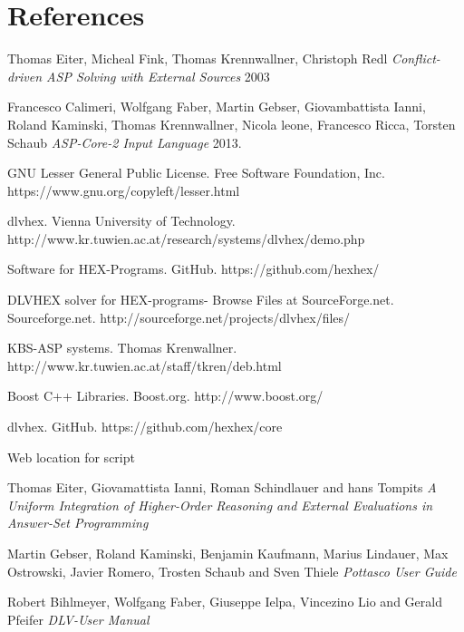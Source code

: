 \documentclass[14pt,a4paper, titlepage]{article}
\begin{document}
\section{References}
\begin{thebibliography}{1}
 Thomas Eiter, Micheal Fink, Thomas Krennwallner, Christoph Redl {\em Conflict-driven ASP Solving with External Sources} 2003   
  
 Francesco Calimeri, Wolfgang Faber, Martin Gebser, Giovambattista Ianni, Roland Kaminski, Thomas Krennwallner, Nicola leone, Francesco Ricca, Torsten Schaub {\em ASP-Core-2 Input Language} 2013.

 GNU Lesser General Public License. Free Software Foundation, Inc. https://www.gnu.org/copyleft/lesser.html 

dlvhex. Vienna University of Technology. http://www.kr.tuwien.ac.at/research/systems/dlvhex/demo.php 

Software for HEX-Programs. GitHub. https://github.com/hexhex/ 

DLVHEX solver for HEX-programs-  Browse Files at SourceForge.net. Sourceforge.net. http://sourceforge.net/projects/dlvhex/files/

KBS-ASP systems. Thomas Krenwallner. http://www.kr.tuwien.ac.at/staff/tkren/deb.html

Boost C++ Libraries. Boost.org. http://www.boost.org/

dlvhex. GitHub. https://github.com/hexhex/core

Web location for script

Thomas Eiter, Giovamattista Ianni, Roman Schindlauer and hans Tompits {\em A Uniform Integration of Higher-Order Reasoning and External Evaluations in Answer-Set Programming} 


Martin Gebser, Roland Kaminski, Benjamin Kaufmann, Marius Lindauer, Max Ostrowski, Javier Romero, Trosten Schaub and Sven Thiele {\em Pottasco User Guide}

Robert Bihlmeyer, Wolfgang Faber, Giuseppe Ielpa, Vincezino Lio and Gerald Pfeifer {\em DLV-User Manual} 
      
 
 \end{thebibliography} 
\end{document}
